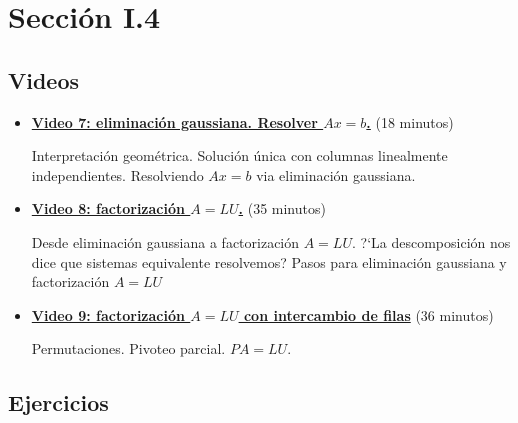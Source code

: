 \documentclass[12pt,a4paper]{article}
\newcommand\1{\mbox{\,\vrule height-0.8pt depth1.0pt width2pc\,}}
\newcommand\2{\mbox{\,\vrule height-0.8pt depth1.0pt width1pc\,}}
\begin{document}
\begin{enumerate}
\end{enumerate}







\section{Sección I.4}

\subsection*{Videos}

\begin{itemize}
\item \href{https://youtu.be/xufm3lvZqaw}{\bf Video 7: eliminaci\'on gaussiana. Resolver $Ax=b$.} (18 minutos)

Interpretaci\'on geom\'etrica.  Soluci\'on \'unica con columnas linealmente independientes. Resolviendo $Ax=b$ via eliminaci\'on gaussiana.


\item \href{https://youtu.be/nIZDjqLbCHk}{\bf Video 8: factorizaci\'on $A=LU$.} (35 minutos)

Desde eliminaci\'on gaussiana a factorizaci\'on $A=LU$. ?`La descomposici\'on nos dice que sistemas equivalente resolvemos? Pasos para eliminaci\'on gaussiana y factorizaci\'on $A=LU$



\item \href{https://youtu.be/thrYutfux9Q}{\bf Video 9: factorizaci\'on $A=LU$ con intercambio de filas} (36 minutos) 

Permutaciones. Pivoteo parcial. $PA=LU$.


\end{itemize}

\subsection*{Ejercicios}
\end{document}
